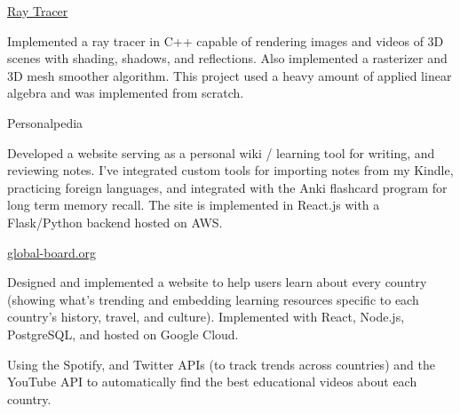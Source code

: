 \begin{cventries}
  \cventry
    {} %
    {\href{https://github.com/dangbert/raytracer/tree/master}{Ray Tracer}} %
    {} %
    {} %
    {
      \begin{cvitems} %
      \item {Implemented a ray tracer in C++ capable of rendering images and videos of 3D scenes with shading, shadows, and reflections.  Also implemented a rasterizer and 3D mesh smoother algorithm.  This project used a heavy amount of applied linear algebra and was implemented from scratch.}
      \end{cvitems}
    }

  \cventry
    {} %
    {Personalpedia} %
    {} %
    {} %
    {
      \begin{cvitems} %
      \item {Developed a website serving as a personal wiki / learning tool for writing, and reviewing notes.  I've integrated custom tools for importing notes from my Kindle, practicing foreign languages, and integrated with the Anki flashcard program for long term memory recall.  The site is implemented in React.js with a Flask/Python backend hosted on AWS.}
      \end{cvitems}
    }

  \cventry
    {} %
    {\href{https://global-board.org}{global-board.org}} %
    {} %
    {} %
    {
      \begin{cvitems} %
        \item {Designed and implemented a website to help users learn about every country (showing what's trending and embedding learning resources specific to each country's history, travel, and culture).  Implemented with React, Node.js, PostgreSQL, and hosted on Google Cloud.}
        \item {Using the Spotify, and Twitter APIs (to track trends across countries) and the YouTube API to automatically find the best educational videos about each country.}
      \end{cvitems}
    }

\end{cventries}
